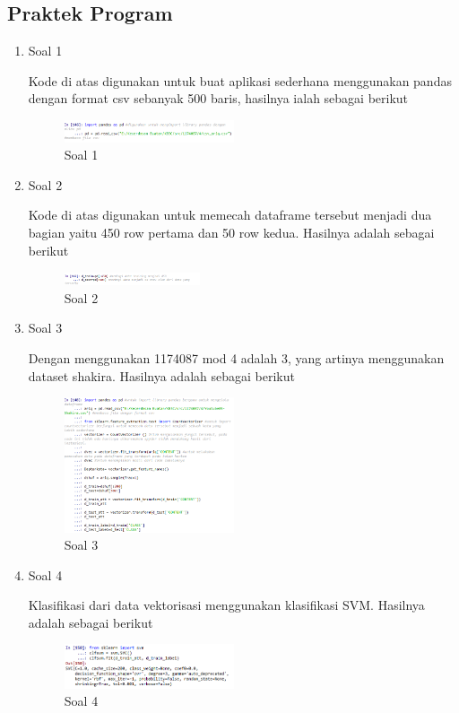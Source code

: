 \subsection{Praktek Program}
\begin{enumerate}
	\item Soal 1
	\hfill\break
	
	Kode di atas digunakan untuk buat aplikasi sederhana menggunakan pandas dengan format csv sebanyak 500 baris, hasilnya ialah sebagai berikut  
	\begin{figure}[H]
	\centering
		\includegraphics[width=5cm]{figures/1174087/4/5.png}
		\caption{Soal 1}
	\end{figure}

	\item Soal 2
	\hfill\break
	
	Kode di atas digunakan untuk memecah dataframe tersebut menjadi dua bagian yaitu 450 row pertama dan 50 row kedua. Hasilnya adalah sebagai berikut 
	\begin{figure}[H]
	\centering
		\includegraphics[width=4cm]{figures/1174087/4/6.png}
		\caption{Soal 2}
	\end{figure}

	\item Soal 3
	\hfill\break
	
	Dengan menggunakan 1174087 mod 4 adalah 3, yang artinya menggunakan dataset shakira. Hasilnya adalah sebagai berikut 
	\begin{figure}[H]
	\centering
		\includegraphics[width=5cm]{figures/1174087/4/7.png}
		\caption{Soal 3}
	\end{figure}

	\item Soal 4
	\hfill\break
	
	Klasifikasi dari data vektorisasi menggunakan klasifikasi SVM. Hasilnya adalah sebagai berikut 
	\begin{figure}[H]
	\centering
		\includegraphics[width=5cm]{figures/1174087/4/8.png}
		\caption{Soal 4}
	\end{figure}


\end{enumerate}
